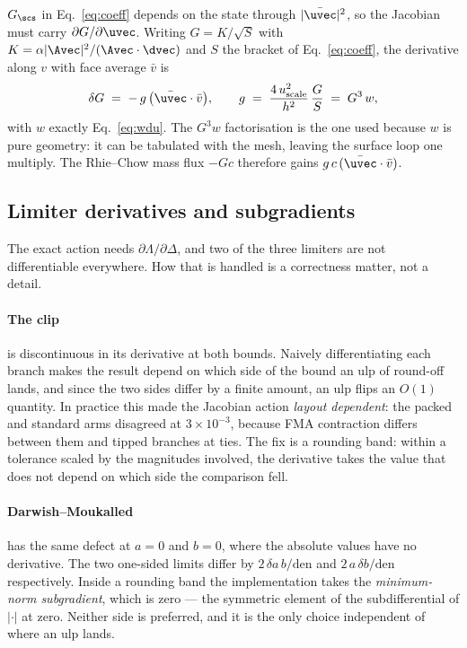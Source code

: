 $G_\scs$ in Eq.~\eqref{eq:coeff} depends on the state through $|\bar{\uvec}|^2$, so the Jacobian
must carry $\partial G/\partial\uvec$. Writing $G = K/\sqrt{S}$ with
$K = \alpha|\Avec|^2/(\Avec\cdot\dvec)$ and $S$ the bracket of Eq.~\eqref{eq:coeff}, the
derivative along $v$ with face average $\bar{v}$ is
\begin{equation}
\delta G \;=\; -\,g\,\bigl(\bar{\uvec}\cdot\bar{v}\bigr),
\qquad
g \;=\; \frac{4\,u^2_{\text{scale}}}{h^2}\,\frac{G}{S} \;=\; G^3\,w ,
\end{equation}
with $w$ exactly Eq.~\eqref{eq:wdu}. The $G^3 w$ factorisation is the one used because $w$ is pure
geometry: it can be tabulated with the mesh, leaving the surface loop one multiply. The
Rhie--Chow mass flux $-G c$ therefore gains $g\,c\,(\bar{\uvec}\cdot\bar{v})$.

\subsection{Limiter derivatives and subgradients}
\label{sec:jac:subgrad}

The exact action needs $\partial\Lambda/\partial\Delta$, and two of the three limiters are not
differentiable everywhere. How that is handled is a correctness matter, not a detail.

\paragraph{The clip} is discontinuous in its derivative at both bounds. Naively differentiating
each branch makes the result depend on which side of the bound an ulp of round-off lands, and
since the two sides differ by a finite amount, an ulp flips an $O(1)$ quantity. In practice this
made the Jacobian action \emph{layout dependent}: the packed and standard arms disagreed at
$3\times10^{-3}$, because FMA contraction differs between them and tipped branches at ties. The
fix is a rounding band: within a tolerance scaled by the magnitudes involved, the derivative takes
the value that does not depend on which side the comparison fell.

\paragraph{Darwish--Moukalled} has the same defect at $a=0$ and $b=0$, where the absolute values
have no derivative. The two one-sided limits differ by $2\,\delta a\,b/\mathrm{den}$ and
$2\,a\,\delta b/\mathrm{den}$ respectively. Inside a rounding band the implementation takes the
\emph{minimum-norm subgradient}, which is zero --- the symmetric element of the subdifferential of
$|\cdot|$ at zero. Neither side is preferred, and it is the only choice independent of where an
ulp lands.

